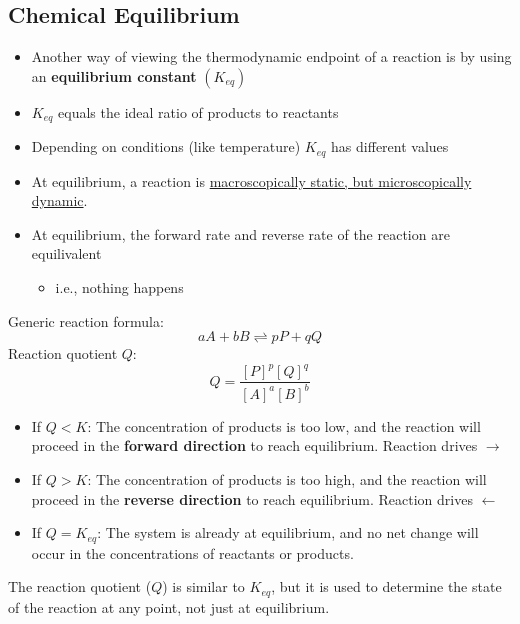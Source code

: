 \documentclass[10pt]{article}
\begin{document}
\subsection*{Chemical Equilibrium}
\begin{itemize}
    \item Another way of viewing the thermodynamic endpoint of a reaction is by using an \textbf{equilibrium constant} $(K_{eq})$
    \item $K_{eq}$ equals the ideal ratio of products to reactants
    \item Depending on conditions (like temperature) $K_{eq}$ has different values
    \item At equilibrium, a reaction is \underline{macroscopically static, but microscopically dynamic}.
    \item At equilibrium, the forward rate and reverse rate of the reaction are equilivalent
    \begin{itemize}
        \item i.e., nothing happens
    \end{itemize}
\end{itemize}
Generic reaction formula:
\[aA + bB \rightleftharpoons pP + qQ\]
Reaction quotient $Q$:
\[Q = \frac{[P]^p[Q]^q}{[A]^a[B]^b}\]
\begin{itemize}
    \item If $Q < K$: The concentration of products is too low, and the reaction will proceed in the \textbf{forward direction} to reach equilibrium.  Reaction drives $\rightarrow$
    \item If $Q > K$: The concentration of products is too high, and the reaction will proceed in the \textbf{reverse direction} to reach equilibrium.  Reaction drives $\leftarrow$
    \item If $Q = K_{eq}$: The system is already at equilibrium, and no net change will occur in the concentrations of reactants or products.
\end{itemize}
The reaction quotient ($Q$) is similar to $K_{eq}$, but it is used to determine the state of the reaction at any point, not just at equilibrium.
\end{document}
